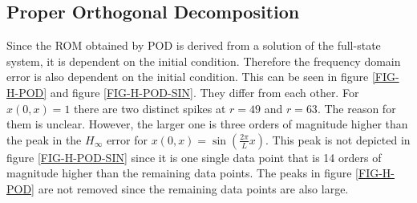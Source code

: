 \subsection{Proper Orthogonal Decomposition}
Since the ROM obtained by POD is derived from a solution of the full-state system, it is dependent on the initial condition.
Therefore the frequency domain error is also dependent on the initial condition.
This can be seen in figure \ref{FIG-H-POD} and figure \ref{FIG-H-POD-SIN}. They differ from each other.
For \(x(0, x) = 1\) there are two distinct spikes at \(r=49\) and \(r=63\).
The reason for them is unclear. However, the larger one is three orders of magnitude higher than the peak in the \(H_{\infty}\) error for $x(0, x) =  \sin(\frac{2\pi}{L}x)$.
This peak is not depicted in figure \ref{FIG-H-POD-SIN} since it is one single data point that is 14 orders of magnitude higher than the remaining data points.
The peaks in figure \ref{FIG-H-POD} are not removed since the remaining data points are also large.
